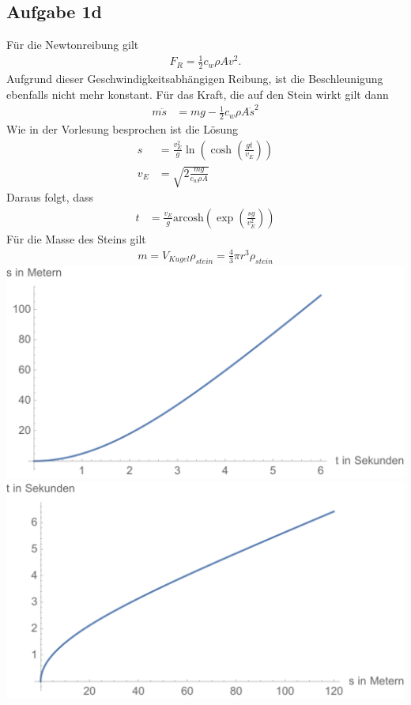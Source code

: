 \documentclass[a4paper,10pt]{extarticle}
\begin{document}
\subsection*{Aufgabe 1d}
Für die Newtonreibung gilt
\begin{align*}
  F_R = \frac{1}{2}c_w\rho A v^2 \mbox{.}
\end{align*}
Aufgrund dieser Geschwindigkeitsabhängigen Reibung, ist die Beschleunigung ebenfalls nicht mehr konstant. 
Für das Kraft, die auf den Stein wirkt gilt dann
\begin{align*}
  m\ddot{s} &= m g - \frac{1}{2}c_w\rho A \dot{s}^2
\end{align*}
Wie in der Vorlesung besprochen ist die Lösung
\begin{align*}
  s   &= \frac{v_E^2}{g} \ln\left(\cosh\left(\frac{gt}{v_E}\right)\right)\\
  v_E &= \sqrt{2\frac{mg}{c_w\rho A}}
\end{align*}
Daraus folgt, dass 
\begin{align*}
  t  &= \frac{v_E}{g}\mbox{arcosh}(\exp(\frac{sg}{v_E^2}))
\end{align*}
Für die Masse des Steins gilt
\begin{align*}
  m = V_{Kugel} \rho_{stein} = \frac{4}{3}\pi r^3 \rho_{stein}
\end{align*}
\includegraphics[scale=0.5]{./Abbildungen/Abbildung_04.pdf}
\includegraphics[scale=0.5]{./Abbildungen/Abbildung_05.pdf}
\end{document}

